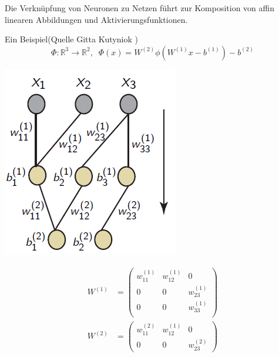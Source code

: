 \documentclass[10pt]{beamer} %
\newcommand{\RR}{\ensuremath{\mathbb{R}}}
\begin{document}
\begin{frame}
   Die Verknüpfung von Neuronen zu Netzen führt zur Komposition von affin linearen Abbildungen und Aktivierungsfunktionen.
   \pause

   Ein Beispiel(Quelle Gitta Kutyniok \cite{})
   \begin{equation*}
      \Phi: \RR^3 \rightarrow \RR^2, \; \; \Phi(x)=W^{(2)}\phi(W^{(1)}x-b^{(1)})-b^{(2)}
   \end{equation*}
   
   \begin{minipage}[c]{0.35\textwidth}
      \includegraphics[width=\textwidth]{pics/FF_sparse.png}
      \end{minipage}
      \begin{minipage}[c]{0.3\textwidth}
         \begin{align*}
            W^{(1)} &= \begin{pmatrix}
               w_{11}^{(1)} & w_{12}^{(1)} &0 \\
               0 &0 &w_{23}^{(1)} \\
               0 &0 &w_{33}^{(1)} \\
            \end{pmatrix} \\
            W^{(2)} &= \begin{pmatrix}
               w_{11}^{(2)} & w_{12}^{(1)} &0 \\
               0 &0 &w_{23}^{(2)}
            \end{pmatrix}
         \end{align*}  
      \end{minipage}
\end{frame}
\end{document}
